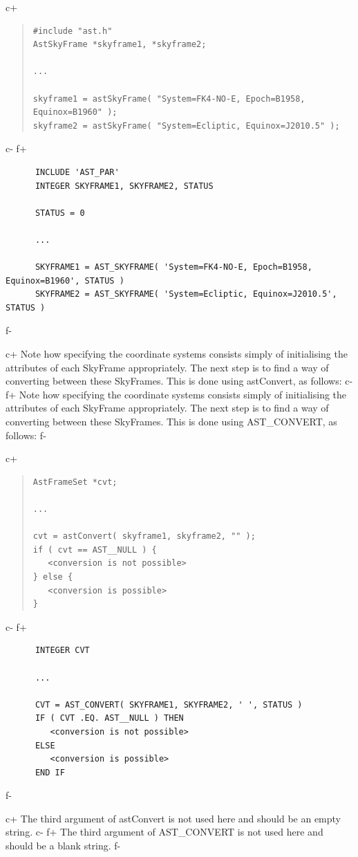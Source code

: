 \documentclass[twoside,11pt]{article}
\begin{document}
c+
\begin{quote}
\small
\begin{verbatim}
#include "ast.h"
AstSkyFrame *skyframe1, *skyframe2;

...

skyframe1 = astSkyFrame( "System=FK4-NO-E, Epoch=B1958, Equinox=B1960" );
skyframe2 = astSkyFrame( "System=Ecliptic, Equinox=J2010.5" );
\end{verbatim}
\normalsize
\end{quote}
c-
f+
\small
\begin{verbatim}
      INCLUDE 'AST_PAR'
      INTEGER SKYFRAME1, SKYFRAME2, STATUS

      STATUS = 0

      ...

      SKYFRAME1 = AST_SKYFRAME( 'System=FK4-NO-E, Epoch=B1958, Equinox=B1960', STATUS )
      SKYFRAME2 = AST_SKYFRAME( 'System=Ecliptic, Equinox=J2010.5', STATUS )
\end{verbatim}
\normalsize
f-

c+
Note how specifying the coordinate systems consists simply of
initialising the attributes of each SkyFrame appropriately.  The next
step is to find a way of converting between these SkyFrames. This is
done using astConvert, as follows:
c-
f+
Note how specifying the coordinate systems consists simply of
initialising the attributes of each SkyFrame appropriately.  The next
step is to find a way of converting between these SkyFrames. This is
done using AST\_CONVERT, as follows:
f-

c+
\begin{quote}
\small
\begin{verbatim}
AstFrameSet *cvt;

...

cvt = astConvert( skyframe1, skyframe2, "" );
if ( cvt == AST__NULL ) {
   <conversion is not possible>
} else {
   <conversion is possible>
}
\end{verbatim}
\normalsize
\end{quote}
c-
f+
\small
\begin{verbatim}
      INTEGER CVT

      ...

      CVT = AST_CONVERT( SKYFRAME1, SKYFRAME2, ' ', STATUS )
      IF ( CVT .EQ. AST__NULL ) THEN
         <conversion is not possible>
      ELSE
         <conversion is possible>
      END IF
\end{verbatim}
\normalsize
f-

c+
The third argument of astConvert is not used here and should be an
empty string.
c-
f+
The third argument of AST\_CONVERT is not used here and should be a
blank string.
f-
\end{document}
